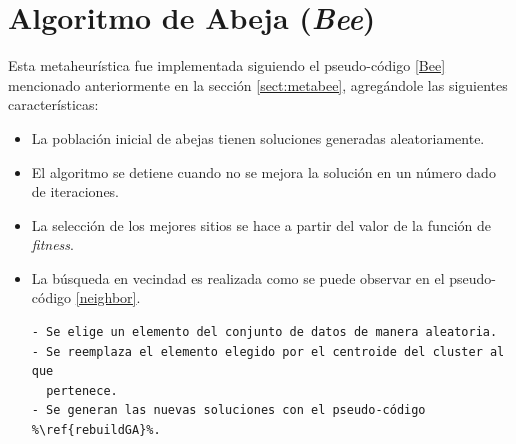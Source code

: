 \section{Algoritmo de Abeja (\emph{Bee})}  \label{sect:ibee}

    Esta metaheurística fue implementada siguiendo el pseudo-código \ref{Bee}
mencionado anteriormente en la sección \ref{sect:metabee}, agregándole las siguientes
características:
\begin{itemize}
    \item La población inicial de abejas tienen soluciones generadas
aleatoriamente.
    \item El algoritmo se detiene cuando no se mejora la solución en un número
dado de iteraciones.
    \item La selección de los mejores sitios se hace a partir del valor de
la función de \emph{fitness}.
    \item La búsqueda en vecindad es realizada como se puede observar en 
el pseudo-código \ref{neighbor}.
\begin{lstlisting}[float=h!, caption={Búsqueda en vecindad}, label=neighbor]
- Se elige un elemento del conjunto de datos de manera aleatoria.
- Se reemplaza el elemento elegido por el centroide del cluster al que
  pertenece.
- Se generan las nuevas soluciones con el pseudo-código %\ref{rebuildGA}%.
\end{lstlisting}
\end{itemize}

